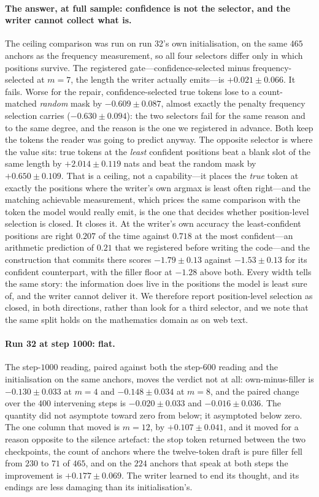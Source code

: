 \documentclass{article} %
\begin{document}
\paragraph{The answer, at full sample: confidence is not the selector, and the writer cannot collect
what is.} The ceiling comparison was run on run 32's own initialisation, on the same $465$ anchors as
the frequency measurement, so all four selectors differ only in which positions survive. The
registered gate---confidence-selected minus frequency-selected at $m{=}7$, the length the writer
actually emits---is $+0.021 \pm 0.066$. It fails. Worse for the repair, confidence-selected true
tokens lose to a count-matched \emph{random} mask by $-0.609 \pm 0.087$, almost exactly the penalty
frequency selection carries ($-0.630 \pm 0.094$): the two selectors fail for the same reason and to
the same degree, and the reason is the one we registered in advance. Both keep the tokens the reader
was going to predict anyway. The opposite selector is where the value sits: true tokens at the
\emph{least} confident positions beat a blank slot of the same length by $+2.014 \pm 0.119$ nats and
beat the random mask by $+0.650 \pm 0.109$. That is a ceiling, not a capability---it places the
\emph{true} token at exactly the positions where the writer's own argmax is least often right---and
the matching achievable measurement, which prices the same comparison with the token the model would
really emit, is the one that decides whether position-level selection is closed. It closes it. At the
writer's own accuracy the least-confident positions are right $0.207$ of the time against $0.718$ at
the most confident---an arithmetic prediction of $0.21$ that we registered before writing the
code---and the construction that commits there scores $-1.79 \pm 0.13$ against $-1.53 \pm 0.13$ for
its confident counterpart, with the filler floor at $-1.28$ above both. Every width tells the same
story: the information does live in the positions the model is least sure of, and the writer cannot
deliver it. We therefore report position-level selection as closed, in both directions, rather than
look for a third selector, and we note that the same split holds on the mathematics domain as on
web text.

\paragraph{Run 32 at step 1000: flat.} The step-$1000$ reading, paired against both the step-$600$
reading and the initialisation on the same anchors, moves the verdict not at all: own-minus-filler is
$-0.130 \pm 0.033$ at $m{=}4$ and $-0.148 \pm 0.034$ at $m{=}8$, and the paired change over the $400$
intervening steps is $-0.020 \pm 0.033$ and $-0.016 \pm 0.036$. The quantity did not asymptote toward
zero from below; it asymptoted below zero. The one column that moved is $m{=}12$, by $+0.107 \pm
0.041$, and it moved for a reason opposite to the silence artefact: the stop token returned between
the two checkpoints, the count of anchors where the twelve-token draft is pure filler fell from $230$
to $71$ of $465$, and on the $224$ anchors that speak at both steps the improvement is $+0.177 \pm
0.069$. The writer learned to end its thought, and its endings are less damaging than its
initialisation's.
\end{document}
